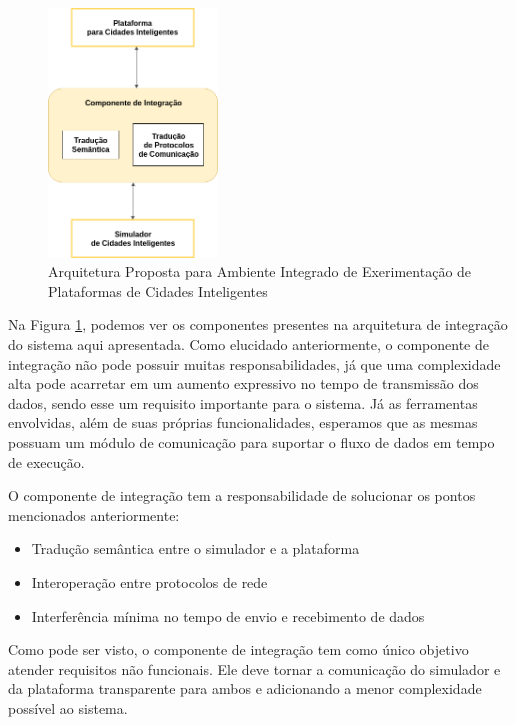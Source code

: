 \begin{figure}[ht]
	\centering
	\includegraphics[width=0.4\textwidth]{figuras/integration-general-architecture.png}
	\caption{Arquitetura Proposta para Ambiente Integrado de Exerimentação de Plataformas de Cidades Inteligentes}
	\label{fig:general_architecture}
\end{figure}


Na Figura \ref{fig:general_architecture}, podemos ver os componentes presentes na arquitetura de integração do sistema aqui apresentada.
Como elucidado anteriormente, o componente de integração não pode possuir muitas responsabilidades, já que uma complexidade alta pode acarretar em um aumento expressivo no
tempo de transmissão dos dados, sendo esse um requisito importante para o sistema.
Já as ferramentas envolvidas, além de suas próprias funcionalidades, esperamos que as mesmas possuam um módulo de comunicação para suportar o fluxo de dados em tempo de execução.

O componente de integração tem a responsabilidade de solucionar os pontos mencionados anteriormente:

\begin{itemize}
    \item Tradução semântica entre o simulador e a plataforma

    \item Interoperação entre protocolos de rede

    \item Interferência mínima no tempo de envio e recebimento de dados
\end{itemize}

Como pode ser visto, o componente de integração tem como único objetivo atender requisitos não funcionais.
Ele deve tornar a comunicação do simulador e da plataforma transparente para ambos e adicionando a menor complexidade possível ao sistema.

